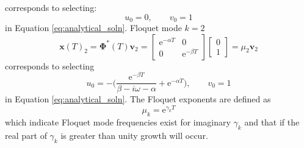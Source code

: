 \documentclass{article}
\begin{document}
 corresponds to selecting:
 \begin{equation}
  u_0=0,\qquad v_0=1
 \end{equation}
 in Equation \ref{eq:analytical_soln}.%
Floquet mode $k=2$
 \begin{equation}
  \mathbf{x}(T)_2=\boldsymbol{\Phi}^*(T)\mathbf{v}_2=\begin{bmatrix*}
  \mathrm{e}^{-\alpha{T}} & 0 \\
  0 & \mathrm{e}^{-\beta{T}}
 \end{bmatrix*}
 \begin{bmatrix*}
  0 \\
  1 
 \end{bmatrix*}
 =\mu_2\mathbf{v}_2
 \end{equation}
corresponds to selecting
\begin{equation}
 u_0=-\Big(\frac{\mathrm{e}^{-\beta{T}}}{\beta-i\omega-\alpha}+\mathrm{e}^{-\alpha{T}}\Big), \qquad v_0=1
\end{equation}
in Equation \ref{eq:analytical_soln}.%
The Floquet exponents are defined as 
\begin{equation*}
 \mu_k=\mathrm{e}^{\gamma_k{T}}
\end{equation*}
which indicate Floquet mode frequencies exist for imaginary $\gamma_k$ and 
that if the real part of $\gamma_k$ is greater than unity growth will occur.
 
\end{document}
